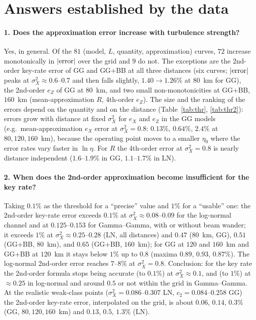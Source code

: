 \documentclass[11pt,a4paper]{article}
\begin{document}
\section{Answers established by the data}
\paragraph{1. Does the approximation error increase with turbulence strength?}
Yes, in general. Of the $81$ (model, $L$, quantity, approximation) curves, $72$ increase monotonically in $|{\rm error}|$ over the grid and $9$ do not. The exceptions are the 2nd-order key-rate error of GG and GG+BB at all three distances (six curves; $|{\rm error}|$ peaks at $\sigma_X^2\approx0.6$--$0.7$ and then falls slightly, $1.40\to1.26\%$ at $80$~km for GG), the 2nd-order $e_Z$ of GG at $80$~km, and two small non-monotonicities at GG+BB, $160$~km (mean-approximation $R$, 4th-order $e_Z$). The size and the ranking of the errors depend on the quantity and on the distance (Table~\ref{tab:thr}, \ref{tab:thr2}): errors grow with distance at fixed $\sigma_X^2$ for $e_X$ and $e_Z$ in the GG models (e.g.\ mean-approximation $e_X$ error at $\sigma_X^2=0.8$: $0.13\%$, $0.64\%$, $2.4\%$ at $80,120,160$~km), because the operating point moves to a smaller $\eta_0$ where the error rates vary faster in $\ln\eta$. For $R$ the 4th-order error at $\sigma_X^2=0.8$ is nearly distance independent ($1.6$--$1.9\%$ in GG, $1.1$--$1.7\%$ in LN).

\paragraph{2. When does the 2nd-order approximation become insufficient for the key rate?}
Taking $0.1\%$ as the threshold for a ``precise'' value and $1\%$ for a ``usable'' one: the 2nd-order key-rate error exceeds $0.1\%$ at $\sigma_X^2\approx0.08$--$0.09$ for the log-normal channel and at $0.125$--$0.153$ for Gamma--Gamma, with or without beam wander; it exceeds $1\%$ at $\sigma_X^2\approx0.25$--$0.28$ (LN, all distances) and $0.47$ ($80$~km, GG), $0.51$ (GG+BB, $80$~km), and $0.65$ (GG+BB, $160$~km); for GG at $120$ and $160$~km and GG+BB at $120$~km it stays below $1\%$ up to $0.8$ (maxima $0.89$, $0.93$, $0.87\%$). The log-normal 2nd-order error reaches $7$--$8\%$ at $\sigma_X^2=0.8$. Conclusion: for the key rate the 2nd-order formula stops being accurate (to $0.1\%$) at $\sigma_X^2\approx0.1$, and (to $1\%$) at $\approx0.25$ in log-normal and around $0.5$ or not within the grid in Gamma--Gamma. At the realistic weak-class points ($\sigma_X^2=0.086$--$0.307$ LN, $c_2=0.084$--$0.258$ GG) the 2nd-order key-rate error, interpolated on the grid, is about $0.06$, $0.14$, $0.3\%$ (GG, $80,120,160$~km) and $0.13$, $0.5$, $1.3\%$ (LN).
\end{document}
